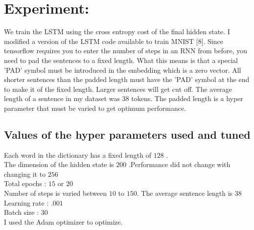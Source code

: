 \documentclass{article} %
\begin{document}
\section{Experiment:}
We train the LSTM using the cross entropy cost of the final hidden state. I modified a version of the LSTM code available to train MNIST [8]. Since tensorflow requires you to enter the number of steps in an RNN from before, you need to pad the sentences to a fixed length. What this means is that a special 'PAD' symbol must be introduced in the embedding which is a zero vector. All shorter sentences than the padded length must have the 'PAD' symbol at the end to make it of the fixed length. Larger sentences will get cut off. The average length of a sentence in my dataset was $38$ tokens.
The padded length is a hyper parameter that must be varied to get optimum performance.
\subsection{Values of the hyper parameters used and tuned}
Each word in the dictionary has a fixed length of $128$ . \\
The dimension of the hidden state is $200$ .Performance did not change with changing it to $256$ \\
Total epochs : $15$ or $20$\\
Number of steps is varied between $10$ to $150$. The average sentence length is  $38$ \\
Learning rate : $.001$\\
Batch size : $30$\\

I used the Adam optimizer to optimize.
\end{document}

